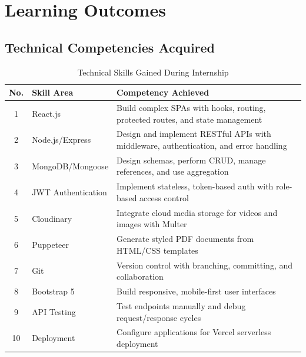 \documentclass[12pt,a4paper]{report}
\begin{document}
\chapter{Learning Outcomes}

\section{Technical Competencies Acquired}

\begin{table}[H]
\centering
\caption{Technical Skills Gained During Internship}
\begin{tabular}{@{}clp{7cm}@{}}
\toprule
\textbf{No.} & \textbf{Skill Area} & \textbf{Competency Achieved} \\ \midrule
1 & React.js & Build complex SPAs with hooks, routing, protected routes, and state management \\
2 & Node.js/Express & Design and implement RESTful APIs with middleware, authentication, and error handling \\
3 & MongoDB/Mongoose & Design schemas, perform CRUD, manage references, and use aggregation \\
4 & JWT Authentication & Implement stateless, token-based auth with role-based access control \\
5 & Cloudinary & Integrate cloud media storage for videos and images with Multer \\
6 & Puppeteer & Generate styled PDF documents from HTML/CSS templates \\
7 & Git & Version control with branching, committing, and collaboration \\
8 & Bootstrap 5 & Build responsive, mobile-first user interfaces \\
9 & API Testing & Test endpoints manually and debug request/response cycles \\
10 & Deployment & Configure applications for Vercel serverless deployment \\ \bottomrule
\end{tabular}
\end{table}
\end{document}
